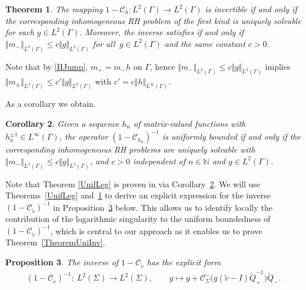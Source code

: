 \documentclass[11pt]{article}
\numberwithin{equation}{section}
\newcommand{\Id}{I}
\newcommand{\tQ}{{\widetilde Q}}
\newcommand{\tv}{{\widetilde v}}
\newcommand{\Cau}{\mathcal C_{\Sigma}}
\newcommand{\Cautv}{\mathcal C_{\tv}}
\newcommand{\Ltwo}{L^2(\Sigma)}
\newtheorem{Theorem}{Theorem}[section]
\newtheorem{Corollary}[Theorem]{Corollary}
\newtheorem{Proposition}[Theorem]{Proposition}
 { \theoremstyle{definition}
\newtheorem{Definition}[Theorem]{Definition}
\newtheorem{Note}[Theorem]{Note}
\newtheorem{Example}[Theorem]{Example}
\newtheorem{Remark}[Theorem]{Remark} }
\numberwithin{equation}{section}
\begin{document}
\begin{Theorem}\label{TheoremInh}
 The mapping $1-\mathcal C_h \colon L^2(\Gamma) \to L^2(\Gamma)$ is invertible if and only if the corresponding inhomogeneous RH problem of the first kind is uniquely solvable for each $g \in L^2(\Gamma)$. Moreover, the inverse satisfies  if and only if $\Vert m_- \Vert_{L^2(\Gamma)} \leq c \Vert g \Vert_{L^2(\Gamma)}$ for all~${g\in L^2(\Gamma)}$ and the same constant $c > 0$.
 \end{Theorem}
 \begin{Remark}
 Note that by \eqref{HJump}, $m_+ = m_- h$ on $\Gamma$, hence $\Vert m_- \Vert_{L^2(\Gamma)} \leq c \Vert g \Vert_{L^2(\Gamma)}$ implies $\Vert m_\pm \Vert_{L^2(\Gamma)} \leq c'\Vert g \Vert_{L^2(\Gamma)}$ with $c'= c\Vert h \Vert_{L^\infty(\Gamma)}$.
 \end{Remark}
 As a corollary we obtain.
 \begin{Corollary}\label{CorHn}
 Given a sequence $h_n$ of matrix-valued functions with $h_n^{\pm 1} \in L^\infty(\Gamma)$, the operator $(1-\mathcal C_{h_n})^{-1}$ is uniformly bounded if and only if the corresponding inhomogeneous RH problems are uniquely solvable with $\Vert m_- \Vert_{L^2(\Gamma)} \leq c \Vert g \Vert_{L^2(\Gamma)}$, and $c > 0$ independent of $n \in \mathbb{N}$ and $g \in L^2(\Gamma)$.
\end{Corollary}
Note that Theorem \ref{UnifLeg} is proven in \cite[Section~4.2]{CD} via Corollary~\ref{CorHn}. We will use Theorems~\ref{UnifLeg} and~\ref{TheoremInh} to derive an explicit expression for the inverse $(1-\Cautv)^{-1}$ in Proposition~\ref{ExpForm} below. This allows us to identify locally the contribution of the logarithmic singularity to the uniform boundedness of $(1-\Cautv)^{-1}$, which is central to our approach as it enables us to prove Theorem~\ref{TheoremUniInv}.
\begin{Proposition}\label{ExpForm}
The inverse of $1-\Cautv$ has the explicit form
\begin{align}\label{ExpInv}
 (1-\Cautv)^{-1}\colon\ \Ltwo \to \Ltwo, \qquad g \mapsto g + \Cau^-\big(g (\tv-\Id) \tQ_+^{-1}\big)\tQ_-.
\end{align}

\end{Proposition}
\end{document}
